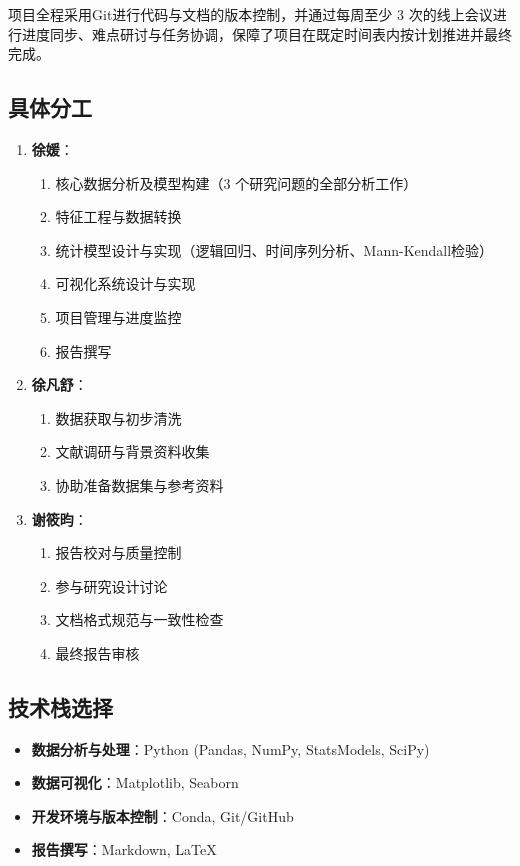 \documentclass[12pt,a4paper]{article}
\begin{document}
项目全程采用Git进行代码与文档的版本控制，并通过每周至少 $3$ 次的线上会议进行进度同步、难点研讨与任务协调，保障了项目在既定时间表内按计划推进并最终完成。

\subsection{具体分工}

\begin{enumerate}
\item \textbf{徐媛}：
  \begin{enumerate}
  \item 核心数据分析及模型构建（$3$ 个研究问题的全部分析工作）
  \item 特征工程与数据转换
  \item 统计模型设计与实现（逻辑回归、时间序列分析、Mann-Kendall检验）
  \item 可视化系统设计与实现
  \item 项目管理与进度监控
  \item 报告撰写
  \end{enumerate}

\item \textbf{徐凡舒}：
  \begin{enumerate}
  \item 数据获取与初步清洗
  \item 文献调研与背景资料收集
  \item 协助准备数据集与参考资料
  \end{enumerate}

\item \textbf{谢筱昀}：
  \begin{enumerate}
  \item 报告校对与质量控制
  \item 参与研究设计讨论
  \item 文档格式规范与一致性检查
  \item 最终报告审核
  \end{enumerate}
\end{enumerate}

\subsection{技术栈选择}

\begin{itemize}
\item \textbf{数据分析与处理}：Python (Pandas, NumPy, StatsModels, SciPy)
\item \textbf{数据可视化}：Matplotlib, Seaborn
\item \textbf{开发环境与版本控制}：Conda, Git/GitHub
\item \textbf{报告撰写}：Markdown, LaTeX
\end{itemize}
\end{document}
